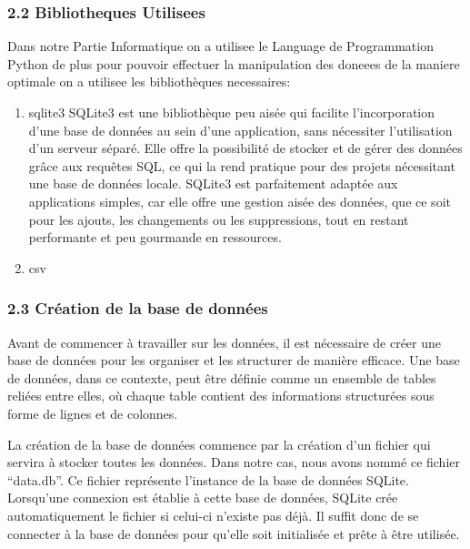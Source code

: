 \documentclass[
]{article}
\providecommand{\tightlist}{%
  \setlength{\itemsep}{0pt}\setlength{\parskip}{0pt}}
\begin{document}
\subsubsection{2.2 Bibliotheques
Utilisees}\label{bibliotheques-utilisees}

Dans notre Partie Informatique on a utilisee le Language de
Programmation Python de plus pour pouvoir effectuer la manipulation des
doneees de la maniere optimale on a utilisee les bibliothèques
necessaires:

\begin{enumerate}
\def\labelenumi{\arabic{enumi}.}
\tightlist
\item
  sqlite3 SQLite3 est une bibliothèque peu aisée qui facilite
  l'incorporation d'une base de données au sein d'une application, sans
  nécessiter l'utilisation d'un serveur séparé. Elle offre la
  possibilité de stocker et de gérer des données grâce aux requêtes SQL,
  ce qui la rend pratique pour des projets nécessitant une base de
  données locale. SQLite3 est parfaitement adaptée aux applications
  simples, car elle offre une gestion aisée des données, que ce soit
  pour les ajouts, les changements ou les suppressions, tout en restant
  performante et peu gourmande en ressources.
\item
  csv
\end{enumerate}

\subsubsection{2.3 Création de la base de
données}\label{cruxe9ation-de-la-base-de-donnuxe9es}

Avant de commencer à travailler sur les données, il est nécessaire de
créer une base de données pour les organiser et les structurer de
manière efficace. Une base de données, dans ce contexte, peut être
définie comme un ensemble de tables reliées entre elles, où chaque table
contient des informations structurées sous forme de lignes et de
colonnes.

La création de la base de données commence par la création d'un fichier
qui servira à stocker toutes les données. Dans notre cas, nous avons
nommé ce fichier ``data.db''. Ce fichier représente l'instance de la
base de données SQLite. Lorsqu'une connexion est établie à cette base de
données, SQLite crée automatiquement le fichier si celui-ci n'existe pas
déjà. Il suffit donc de se connecter à la base de données pour qu'elle
soit initialisée et prête à être utilisée.
\end{document}

